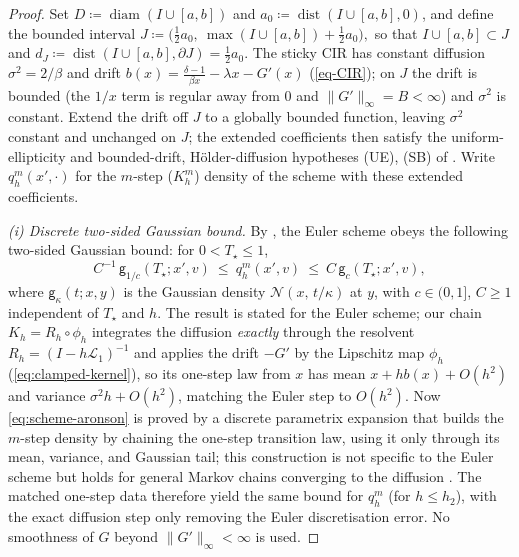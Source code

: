 \documentclass[aap,preprint]{imsart}
\numberwithin{equation}{section}
\theoremstyle{plain}
\theoremstyle{definition}
\begin{document}
\begin{proof}
  Set $D\coloneqq \operatorname{diam}(I\cup[a,b])$ and $a_0\coloneqq \operatorname{dist}(I\cup[a,b],0)$, and define
  the bounded interval
  \(
    J\coloneqq \bigl(\tfrac12 a_0,\ \max(I\cup[a,b])+\tfrac12 a_0\bigr),
  \)
  so that $I\cup[a,b]\subset J$ and $d_J\coloneqq \operatorname{dist}(I\cup[a,b],\partial J)=\tfrac12 a_0$. The
  sticky CIR has constant diffusion $\sigma^2=2/\beta$ and drift
  $b(x)=\tfrac{\delta-1}{\beta x}-\lambda x-G'(x)$ (\cref{eq-CIR}); on $J$ the drift is
  bounded (the $1/x$ term is regular away from $0$ and $\|G'\|_\infty=B<\infty$) and $\sigma^2$ is
  constant. Extend the drift off $J$ to a globally bounded function, leaving $\sigma^2$ constant and
  unchanged on $J$; the extended coefficients then satisfy the uniform-ellipticity and
  bounded-drift, H\"older-diffusion hypotheses \textup{(UE)}, \textup{(SB)} of \citet{LemaireMenozzi2010}. Write $q^{m}_h(x',\cdot)$ for the $m$-step
  ($K_h^{m}$) density of the scheme with these extended coefficients.

  \emph{(i) Discrete two-sided Gaussian bound.} By \citet[Thm.~2.1]{LemaireMenozzi2010}, the Euler
  scheme  obeys the following two-sided Gaussian bound: for $0<T_\star\le1$,
  \begin{equation}\label{eq:scheme-aronson}
    C^{-1}\,\mathsf{g}_{1/c}(T_\star;x',v)\ \le\ q^{m}_h(x',v)\ \le\ C\,\mathsf{g}_{c}(T_\star;x',v),
  \end{equation}
  where $\mathsf{g}_\kappa(t;x,y)$ is the Gaussian density $\mathcal{N}(x,\,t/\kappa)$ at $y$,
  with $c\in(0,1]$, $C\ge1$ independent of $T_\star$ and $h$. The result is stated for the Euler
  scheme; our chain $K_h=R_h\circ\phi_h$ integrates the diffusion \emph{exactly} through the resolvent
  $R_h=(I-h\mathcal L_1)^{-1}$ and applies the drift $-G'$ by the Lipschitz map $\phi_h$
  (\cref{eq:clamped-kernel}), so its one-step law from $x$ has mean $x+hb(x)+O(h^2)$ and variance
  $\sigma^2 h+O(h^2)$, matching the Euler step to $O(h^2)$. Now \eqref{eq:scheme-aronson} is proved by a
  discrete parametrix expansion that builds the $m$-step density by chaining the one-step transition
  law, using it only through its mean, variance, and Gaussian tail; this construction is not specific
  to the Euler scheme but holds for general Markov chains converging to the diffusion
  \citep{KonakovMammen2000}. The matched one-step data therefore yield the same bound for $q^{m}_h$
  (for $h\le h_2$), with the exact diffusion step only removing the Euler discretisation error. No smoothness of $G$ beyond
  $\|G'\|_\infty<\infty$ is used.


\end{proof}
\end{document}
